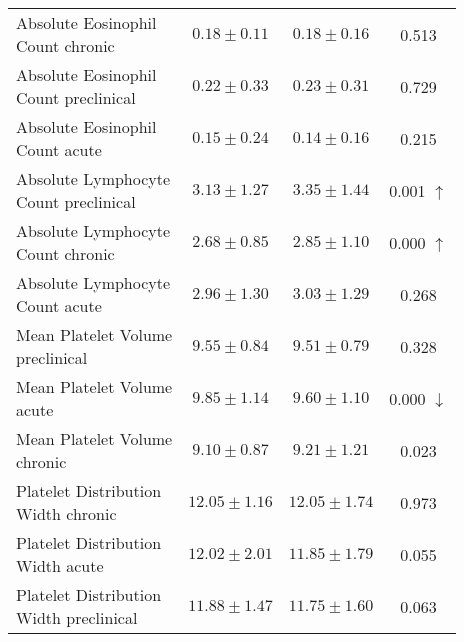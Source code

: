 \begin{table}[htbp]
\begin{tabular}{lccc}
\makecell[l]{Absolute Eosinophil \\ Count chronic} & $0.18 \pm 0.11$ & $0.18 \pm 0.16$ & 0.513  \\

\makecell[l]{Absolute Eosinophil \\ Count preclinical} & $0.22 \pm 0.33$ & $0.23 \pm 0.31$ & 0.729  \\

\makecell[l]{Absolute Eosinophil \\ Count acute} & $0.15 \pm 0.24$ & $0.14 \pm 0.16$ & 0.215  \\

\makecell[l]{Absolute Lymphocyte \\ Count preclinical} & $3.13 \pm 1.27$ & $3.35 \pm 1.44$ & 0.001 $\uparrow$ \\

\makecell[l]{Absolute Lymphocyte \\ Count chronic} & $2.68 \pm 0.85$ & $2.85 \pm 1.10$ & 0.000 $\uparrow$ \\

\makecell[l]{Absolute Lymphocyte \\ Count acute} & $2.96 \pm 1.30$ & $3.03 \pm 1.29$ & 0.268  \\

\makecell[l]{Mean Platelet Volume \\ preclinical} & $9.55 \pm 0.84$ & $9.51 \pm 0.79$ & 0.328  \\

\makecell[l]{Mean Platelet Volume \\ acute} & $9.85 \pm 1.14$ & $9.60 \pm 1.10$ & 0.000 $\downarrow$ \\

\makecell[l]{Mean Platelet Volume \\ chronic} & $9.10 \pm 0.87$ & $9.21 \pm 1.21$ & 0.023  \\

\makecell[l]{Platelet Distribution \\ Width chronic} & $12.05 \pm 1.16$ & $12.05 \pm 1.74$ & 0.973  \\

\makecell[l]{Platelet Distribution \\ Width acute} & $12.02 \pm 2.01$ & $11.85 \pm 1.79$ & 0.055  \\

\makecell[l]{Platelet Distribution \\ Width preclinical} & $11.88 \pm 1.47$ & $11.75 \pm 1.60$ & 0.063  \\


\end{tabular}
\end{table}
